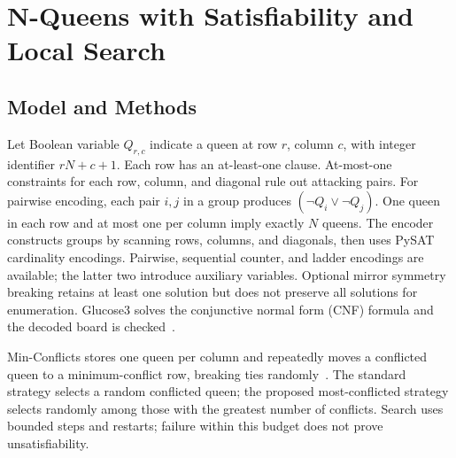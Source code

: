 \documentclass[conference]{IEEEtran}
\begin{document}
\section{N-Queens with Satisfiability and Local Search}
\subsection{Model and Methods}
Let Boolean variable \(Q_{r,c}\) indicate a queen at row \(r\), column \(c\), with integer identifier \(rN+c+1\). Each row has an at-least-one clause. At-most-one constraints for each row, column, and diagonal rule out attacking pairs. For pairwise encoding, each pair \(i,j\) in a group produces \((\neg Q_i\lor\neg Q_j)\). One queen in each row and at most one per column imply exactly \(N\) queens. The encoder constructs groups by scanning rows, columns, and diagonals, then uses PySAT cardinality encodings. Pairwise, sequential counter, and ladder encodings are available; the latter two introduce auxiliary variables. Optional mirror symmetry breaking retains at least one solution but does not preserve all solutions for enumeration. Glucose3 solves the conjunctive normal form (CNF) formula and the decoded board is checked~\cite{pysat}.

Min-Conflicts stores one queen per column and repeatedly moves a conflicted queen to a minimum-conflict row, breaking ties randomly~\cite{minton}. The standard strategy selects a random conflicted queen; the proposed most-conflicted strategy selects randomly among those with the greatest number of conflicts. Search uses bounded steps and restarts; failure within this budget does not prove unsatisfiability.
\end{document}
